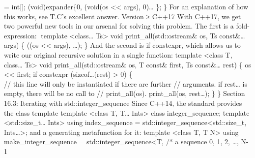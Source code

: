 = int{[}{]}; (void)expander\{0, (void(os \textless\textless{} args),
0)\ldots{} \}; \} For an explanation of how this works, see T.C's
excellent answer. Version ≥ C++17 With C++17, we get two powerful new
tools in our arsenal for solving this problem. The ﬁrst is a
fold-expression: template \textless class\ldots{} Ts\textgreater{} void
print\_all(std::ostream\& os, Ts const\&\ldots{} args) \{ ((os
\textless\textless{} args), \ldots); \} And the second is if constexpr,
which allows us to write our original recursive solution in a single
function: template \textless class T, class\ldots{} Ts\textgreater{}
void print\_all(std::ostream\& os, T const\& first, Ts const\&\ldots{}
rest) \{ os \textless\textless{} first; if constexpr (sizeof\ldots(rest)
\textgreater{} 0) \{\\
// this line will only be instantiated if there are further //
arguments. if rest\ldots{} is empty, there will be no call to //
print\_all(os). print\_all(os, rest\ldots); \} \} Section 16.3:
Iterating with std::integer\_sequence Since C++14, the standard provides
the class template template \textless class T, T\ldots{}
Ints\textgreater{} class integer\_sequence; template
\textless std::size\_t\ldots{} Ints\textgreater{} using index\_sequence
= std::integer\_sequence\textless std::size\_t, Ints\ldots\textgreater;
and a generating metafunction for it: template \textless class T, T
N\textgreater{} using make\_integer\_sequence =
std::integer\_sequence\textless T, /* a sequence 0, 1, 2, \ldots, N-1
